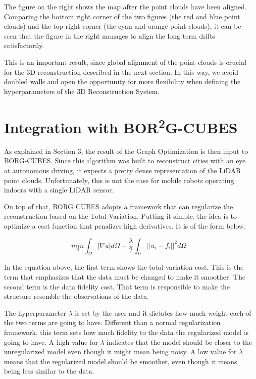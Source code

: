 \documentclass[11pt]{article}
\begin{document}
The figure on the right shows the map after the point clouds have been aligned. Comparing the bottom right corner of the two figures (the red and blue point clouds) and the top right corner (the cyan and orange point clouds), it can be seen that the figure in the right manages to align the long term drifts satisfactorily.
	
This is an important result, since global alignment of the point clouds is crucial for the 3D reconstruction described in the next section. In this way, we avoid doubled walls and open the opportunity for more flexibility when defining the hyperparameters of the 3D Reconstruction System.
	
	\newpage
	\section{Integration with BOR\textsuperscript{2}G-CUBES}
	\label{sec:Borg}
	
As explained in Section 3, the result of the Graph Optimization is then input to BORG-CUBES. Since this algorithm was built to reconstruct cities with an eye at autonomous driving, it expects a pretty dense representation of the LiDAR point clouds. Unfortunately, this is not the case for mobile robots operating indoors with a single LiDAR sensor.
	
On top of that, BORG CUBES adopts a framework that can regularize the reconstruction based on the Total Variation. Putting it simple, the idea is to optimize a cost function that penalizes high derivatives. It is of the form below:


\begin{equation}
\underset{u}{min} \int_{\Omega } | \nabla u| d \Omega + \frac{\lambda}{2} \int_{\Omega}||u_i - f_i||^2 d \Omega
\label{eq:Regularizer}
\end{equation}

In the equation above, the first term shows the total variation cost. This is the term that emphasizes that the data must be changed to make it smoother. The second term is the data fidelity cost. That term is responsible to make the structure resemble the observations of the data.

The hyperparameter $\lambda$ is set by the user and it dictates how much weight each of the two terms are going to have. Different than a normal regularization framework, this term sets how much fidelity to the data the regularized model is going to have. A high value for $\lambda$ indicates that the model should be closer to the unregularized model even though it might mean being noisy. A low value for $\lambda$ means that the regularized model should be smoother, even though it means being less similar to the data.
\end{document}
